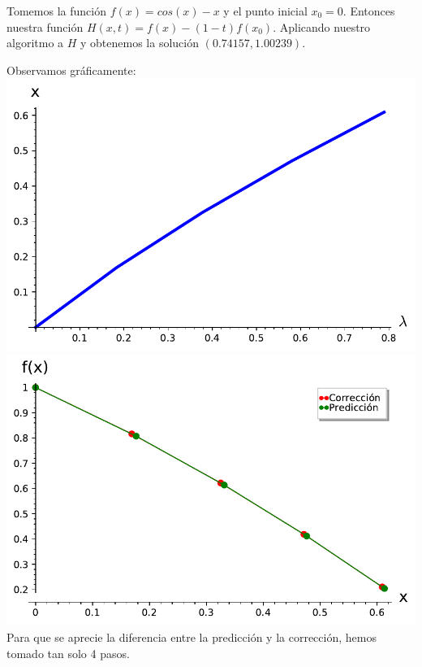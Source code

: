 \begin{example}
	Tomemos la función $f(x) = cos(x)-x$ y el punto inicial $x_0 = 0$. Entonces nuestra función $H(x,t) = f(x)-(1-t)f(x_0)$. Aplicando nuestro algoritmo a $H$ y obtenemos la solución $(0.74157,1.00239)$.
	
	Observamos gráficamente:\\
	
	\includegraphics[scale=0.5]{imagenes/ejemplo1_continuacion.pdf}{\centering}
	\includegraphics[scale=0.5]{imagenes/ejemplo1_1_continuacion.pdf}{\centering}\\
	Para que se aprecie la diferencia entre la predicción y la corrección, hemos tomado tan solo 4 pasos.

\end{example}

